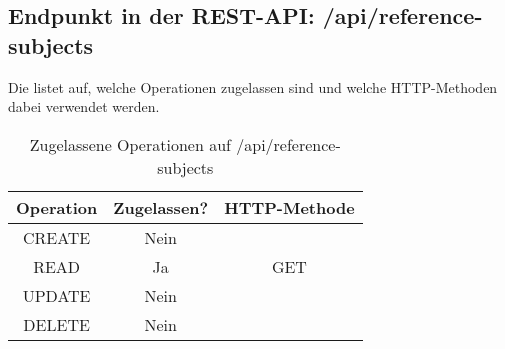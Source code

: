 \subsection{Endpunkt in der REST-API: /api/reference-subjects}
\label{sec:end:rest:api:reference-subjects}
Die  listet auf, welche Operationen zugelassen sind und welche HTTP-Methoden dabei verwendet werden. 

\begin{table}[!htbp]
	\begin{tabular}{|c|c|c|}
		\hline
			\textbf{Operation} & \textbf{Zugelassen?} & \textbf{HTTP-Methode} \\ \hline
			CREATE & Nein & \\ \hline 
			READ & Ja & GET \\ \hline
			UPDATE & Nein & \\ \hline 
			DELETE & Nein & \\ \hline
	\end{tabular}

		\caption{Zugelassene Operationen auf /api/reference-subjects}
		\label{tab:end:rest:api:reference-subjects:meth}
\end{table}